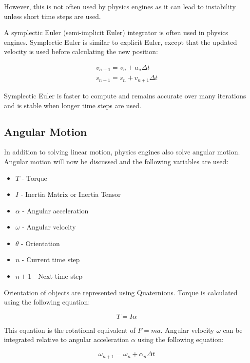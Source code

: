 However, this is not often used by physics engines as it can lead to instability unless short time steps are used.

A symplectic Euler (semi-implicit Euler) integrator is often used in physics engines. Symplectic Euler is similar to explicit Euler, except that the updated velocity is used before calculating the new position:

\begin{equation}
\begin{split}
	v_{n+1}=v_n+a_n{\Delta}t\\
	s_{n+1}=s_n+v_{n+1}{\Delta}t
\end{split}
\end{equation}

Symplectic Euler is faster to compute and remains accurate over many iterations and is stable when longer time steps are used.

\subsection{Angular Motion}
In addition to solving linear motion, physics engines also solve angular motion. Angular motion will now be discussed and the following variables are used:
\begin{itemize}
	\item $T$ - Torque
	\item $I$ - Inertia Matrix or Inertia Tensor
	\item $\alpha$ - Angular acceleration
	\item $\omega$ - Angular velocity
	\item $\theta$ - Orientation
	\item $n$ - Current time step
	\item $n+1$ - Next time step
\end{itemize}

Orientation of objects are represented using Quaternions. Torque is calculated using the following equation:

\begin{equation}
T=I\alpha
\end{equation}

This equation is the rotational equivalent of $F=ma$.
Angular velocity $\omega$ can be integrated relative to angular acceleration $\alpha$ using the following equation:

\begin{equation}
\omega_{n+1}=\omega_n+\alpha_n\Delta t
\end{equation}

